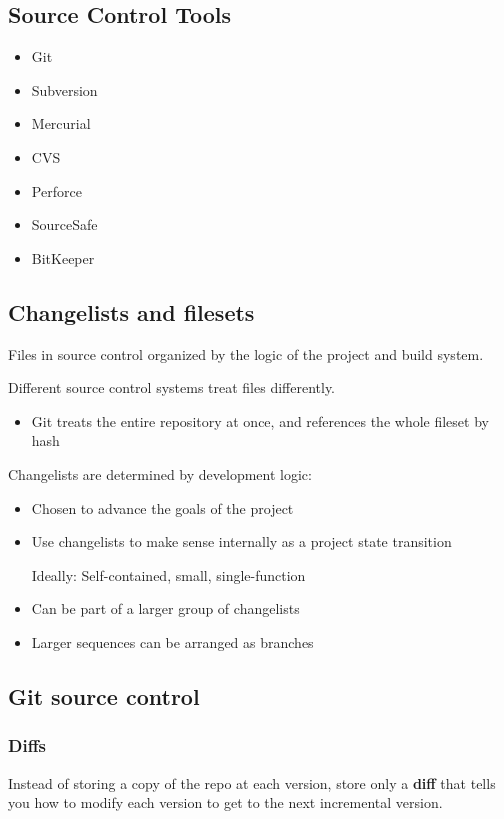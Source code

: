 \documentclass{article}
\begin{document}
\subsection{Source Control Tools}

\begin{itemize}
    \item Git
    \item Subversion
    \item Mercurial
    \item CVS
    \item Perforce
    \item SourceSafe
    \item BitKeeper
\end{itemize}

\subsection{Changelists and filesets}

Files in source control organized by the logic of the project and build system.

\vspace*{1em}

Different source control systems treat files differently.
\begin{itemize}
    \item Git treats the entire repository at once, and references the whole fileset by hash
\end{itemize}
    
Changelists are determined by development logic:
\begin{itemize}
    \item Chosen to advance the goals of the project
    \item Use changelists to make sense internally as a project state transition\par
    Ideally: Self-contained, small, single-function
    \item Can be part of a larger group of changelists
    \item Larger sequences can be arranged as branches
\end{itemize}

\subsection{Git source control}

\subsubsection{Diffs}
Instead of storing a copy of the repo at each version, store only a \textbf{diff} that tells you how to modify each version to get to the next incremental version.
\end{document}
